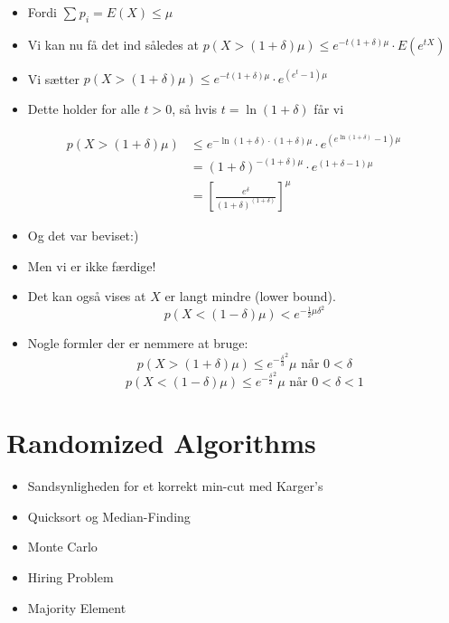\documentclass[11pt]{article}
\theoremstyle{definition}
\theoremstyle{remark}
\begin{document}
\begin{itemize}
\item Fordi $\sum_{}^{}p_{i} = E(X) \leq \mu$
\item Vi kan nu få det ind således at $p(X > (1 + \delta) \mu) \leq e^{-t(1 + \delta) \mu} \cdot E(e^{tX})$
\item Vi sætter $p(X > (1+\delta)\mu) \leq e^{-t (1+\delta) \mu} \cdot e^{(e^{t}-1)\mu}$
\item Dette holder for alle $t > 0$, så hvis $t = \ln (1+ \delta)$ får vi 
\end{itemize}


\begin{equation*}
  \begin{split}
    p(X > (1 + \delta) \mu) &\leq e^{-\ln(1 + \delta) \cdot (1 + \delta) \mu} \cdot e^{(e^{\ln (1 + \delta)}-1) \mu}\\
                     &= (1+ \delta)^{-(1+ \delta) \mu} \cdot e^{(1 + \delta-1) \mu}\\
    &= \left[ \frac{e^{\delta}}{(1+\delta)^{(1+\delta)}} \right]^{\mu}
  \end{split}
\end{equation*}

\begin{itemize}
\item Og det var beviset:)
\item Men vi er ikke færdige!
\item Det kan også vises at $X$ er langt mindre (lower bound). \[ p(X < (1 - \delta) \mu) < e^{- \frac{1}{2}\mu \delta^{2}} \]
\item Nogle formler der er nemmere at bruge: \[ p(X > (1 + \delta) \mu) \leq e^{- \frac{\delta}{3}^{2}} \mu \text{ når } 0 < \delta \]
  \[ p(X < (1- \delta) \mu ) \leq e^{- \frac{\delta}{2}^{2}}\mu \text{ når } 0 < \delta < 1 \]
\end{itemize}






\newpage


\section{Randomized Algorithms}
\label{sec:random}

\begin{itemize}
\item Sandsynligheden for et korrekt min-cut med Karger's
\item Quicksort og Median-Finding
\item Monte Carlo
\item Hiring Problem
\item Majority Element
\end{itemize}
\end{document}
